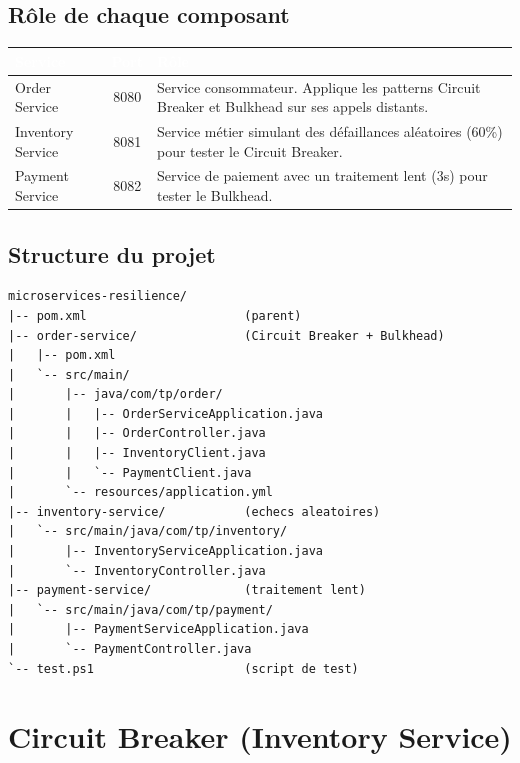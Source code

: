 \documentclass[11pt,a4paper]{article}
\newcommand{\hdrcell}[1]{\textbf{\textcolor{white}{#1}}}
\begin{document}
\subsection*{Rôle de chaque composant}

\begin{tabularx}{\linewidth}{|l|c|X|}
    \hline
    \rowcolor{primaryblue} \hdrcell{Service} & \hdrcell{Port} & \hdrcell{Rôle} \\
    \hline
    Order Service & 8080 & Service consommateur. Applique les patterns Circuit Breaker et Bulkhead sur ses appels distants. \\
    \hline
    Inventory Service & 8081 & Service métier simulant des défaillances aléatoires (60\%) pour tester le Circuit Breaker. \\
    \hline
    Payment Service & 8082 & Service de paiement avec un traitement lent (3s) pour tester le Bulkhead. \\
    \hline
\end{tabularx}

\subsection*{Structure du projet}

\begin{lstlisting}[basicstyle=\ttfamily\footnotesize, frame=single, backgroundcolor=\color{codebg}]
microservices-resilience/
|-- pom.xml                      (parent)
|-- order-service/               (Circuit Breaker + Bulkhead)
|   |-- pom.xml
|   `-- src/main/
|       |-- java/com/tp/order/
|       |   |-- OrderServiceApplication.java
|       |   |-- OrderController.java
|       |   |-- InventoryClient.java
|       |   `-- PaymentClient.java
|       `-- resources/application.yml
|-- inventory-service/           (echecs aleatoires)
|   `-- src/main/java/com/tp/inventory/
|       |-- InventoryServiceApplication.java
|       `-- InventoryController.java
|-- payment-service/             (traitement lent)
|   `-- src/main/java/com/tp/payment/
|       |-- PaymentServiceApplication.java
|       `-- PaymentController.java
`-- test.ps1                     (script de test)
\end{lstlisting}

\section{Circuit Breaker (Inventory Service)}
\end{document}
